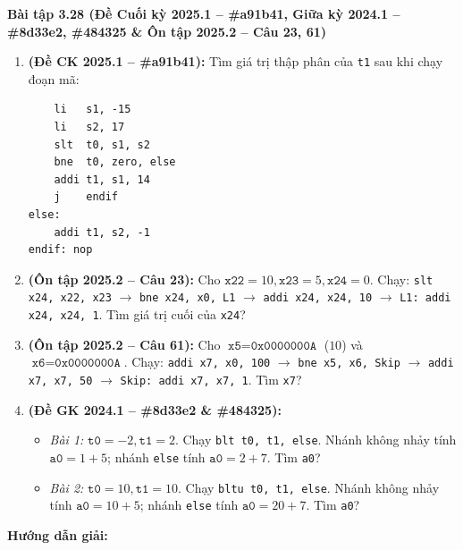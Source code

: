 \textbf{Bài tập 3.28 (Đề Cuối kỳ 2025.1 -- \#a91b41, Giữa kỳ 2024.1 -- \#8d33e2, \#484325 \& Ôn tập 2025.2 -- Câu 23, 61)}
\begin{enumerate}[label=\alph*)]
    \item \textbf{(Đề CK 2025.1 -- \#a91b41):} Tìm giá trị thập phân của \texttt{t1} sau khi chạy đoạn mã:
\begin{lstlisting}
    li   s1, -15
    li   s2, 17
    slt  t0, s1, s2
    bne  t0, zero, else
    addi t1, s1, 14
    j    endif
else:
    addi t1, s2, -1
endif: nop
\end{lstlisting}
    \item \textbf{(Ôn tập 2025.2 -- Câu 23):} Cho $\texttt{x22} = 10, \texttt{x23} = 5, \texttt{x24} = 0$. Chạy: \texttt{slt x24, x22, x23} $\rightarrow$ \texttt{bne x24, x0, L1} $\rightarrow$ \texttt{addi x24, x24, 10} $\rightarrow$ \texttt{L1: addi x24, x24, 1}. Tìm giá trị cuối của \texttt{x24}?
    \item \textbf{(Ôn tập 2025.2 -- Câu 61):} Cho $\texttt{x5} = \texttt{0x0000000A}$ ($10$) và $\texttt{x6} = \texttt{0x0000000A}$. Chạy: \texttt{addi x7, x0, 100} $\rightarrow$ \texttt{bne x5, x6, Skip} $\rightarrow$ \texttt{addi x7, x7, 50} $\rightarrow$ \texttt{Skip: addi x7, x7, 1}. Tìm \texttt{x7}?
    \item \textbf{(Đề GK 2024.1 -- \#8d33e2 \& \#484325):}
    \begin{itemize}
        \item \textit{Bài 1:} $\texttt{t0} = -2, \texttt{t1} = 2$. Chạy \texttt{blt t0, t1, else}. Nhánh không nhảy tính $\texttt{a0} = 1 + 5$; nhánh \texttt{else} tính $\texttt{a0} = 2 + 7$. Tìm \texttt{a0}?
        \item \textit{Bài 2:} $\texttt{t0} = 10, \texttt{t1} = 10$. Chạy \texttt{bltu t0, t1, else}. Nhánh không nhảy tính $\texttt{a0} = 10 + 5$; nhánh \texttt{else} tính $\texttt{a0} = 20 + 7$. Tìm \texttt{a0}?
    \end{itemize}
\end{enumerate}
\textbf{Hướng dẫn giải:}
